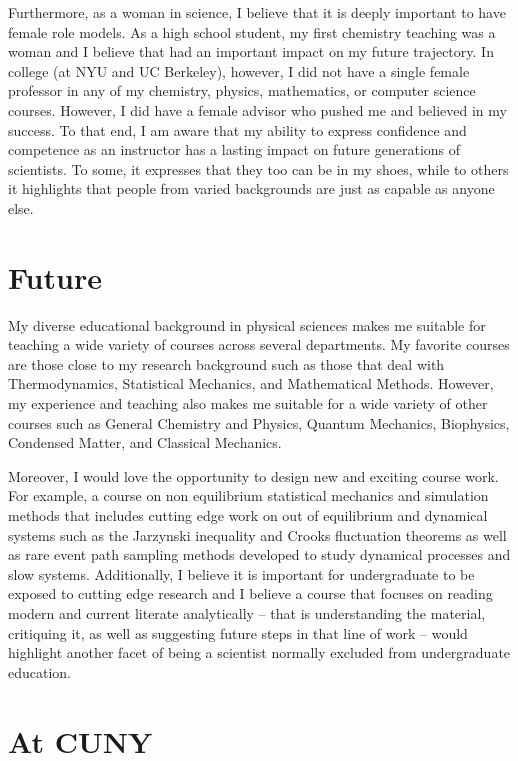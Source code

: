 \documentclass[11pt]{article}
\begin{document}
Furthermore, as a woman in science, I believe that it is deeply important to have female role models.  As a high school student, my first chemistry teaching was a woman and I believe that had an important impact on my future trajectory.  In college (at NYU and UC Berkeley), however, I did not have a single female professor in any of my chemistry, physics, mathematics, or computer science courses.  However, I did have a female advisor who pushed me and believed in my success.  To that end, I am aware that my ability to express confidence and competence as an instructor has a lasting impact on future generations of scientists.  To some, it expresses that they too can be in my shoes, while to others it highlights that people from varied backgrounds are just as capable as anyone else.

\section{Future} %

My diverse educational background in physical sciences makes me suitable for teaching a wide variety of courses across several departments.  My favorite courses are those close to my research background such as those that deal with Thermodynamics, Statistical Mechanics, and Mathematical Methods.  However, my experience and teaching also makes me suitable for a wide variety of other courses such as General Chemistry and Physics, Quantum Mechanics, Biophysics, Condensed Matter, and Classical Mechanics.

Moreover, I would love the opportunity to design new and exciting course work.  For example, a course on non equilibrium statistical mechanics and simulation methods that includes cutting edge work on out of equilibrium and dynamical systems such as the Jarzynski inequality and Crooks fluctuation theorems as well as rare event path sampling methods developed to study dynamical processes and slow systems.  Additionally, I believe it is important for undergraduate to be exposed to cutting edge research and I believe a course that focuses on reading modern and current literate analytically -- that is understanding the material, critiquing it, as well as suggesting future steps in that line of work -- would highlight another facet of being a scientist normally excluded from undergraduate education.

\section{At CUNY} %
\end{document}
